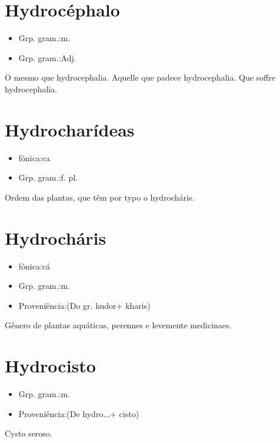 \documentclass{article}
\begin{document}
\section{Hydrocéphalo}
\begin{itemize}
\item {Grp. gram.:m.}
\end{itemize}
\begin{itemize}
\item {Grp. gram.:Adj.}
\end{itemize}
O mesmo que \textunderscore hydrocephalia\textunderscore .
Aquelle que padece hydrocephalia.
Que soffre hydrocephalia.
\section{Hydrocharídeas}
\begin{itemize}
\item {fónica:ca}
\end{itemize}
\begin{itemize}
\item {Grp. gram.:f. pl.}
\end{itemize}
Ordem das plantas, que têm por typo o hydrocháris.
\section{Hydrocháris}
\begin{itemize}
\item {fónica:cá}
\end{itemize}
\begin{itemize}
\item {Grp. gram.:m.}
\end{itemize}
\begin{itemize}
\item {Proveniência:(Do gr. \textunderscore hudor\textunderscore  + \textunderscore kharis\textunderscore )}
\end{itemize}
Gênero de plantas aquáticas, perennes e levemente medicinaes.
\section{Hydrocisto}
\begin{itemize}
\item {Grp. gram.:m.}
\end{itemize}
\begin{itemize}
\item {Proveniência:(De \textunderscore hydro...\textunderscore  + \textunderscore cisto\textunderscore )}
\end{itemize}
Cysto seroso.
\end{document}
